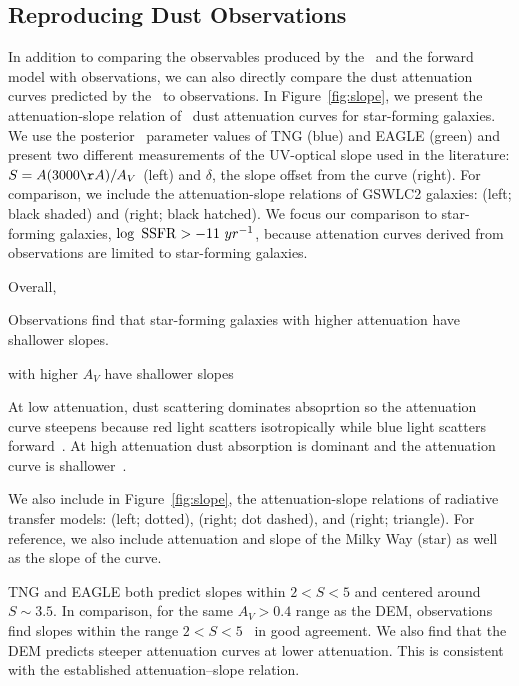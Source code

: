 \subsection{Reproducing Dust Observations} 
In addition to comparing the observables produced by the \eda~and the forward
model with observations, we can also directly compare the dust attenuation
curves predicted by the \eda~to observations. In Figure~\ref{fig:slope}, we
present the attenuation-slope relation of \eda~dust attenuation curves for
star-forming galaxies. We use the posterior \eda~parameter values of TNG (blue)
and EAGLE (green) and present two different measurements of the UV-optical slope
used in the literature: $S = A(3000\AA)/A_V$ (left) and $\delta$, the slope
offset from the \cite{calzetti2001} curve (right). For comparison, we include
the attenuation-slope relations of GSWLC2 galaxies: \cite{salim2020} (left;
black shaded) and \cite{salim2018} (right; black hatched). We focus our
comparison to star-forming galaxies, $\log~{\rm SSFR} > -11~{yr}^{-1}$, because
attenation curves derived from observations are limited to star-forming galaxies. 

Overall, 

Observations find that star-forming galaxies with higher attenuation have
shallower slopes. 

with higher $A_V$ have
shallower slopes


At low attenuation, dust scattering dominates absoprtion so the 
attenuation curve steepens because red light scatters isotropically while blue light
scatters forward~\citep{gordon1994, witt2000, draine2003}. %
At high attenuation dust absorption is dominant and the attenuation curve is
shallower~\citep{chevallard2013}.



We also include in Figure~\ref{fig:slope}, the attenuation-slope relations of
radiative transfer models: \cite{inoue2005} (left; dotted), \cite{chevallard2013}
(right; dot dashed), and \cite{trayford2020} (right; triangle).
For reference, we also include attenuation and slope of the Milky Way (star)
as well as the slope of the \cite{calzetti2001} curve. 








TNG and EAGLE both predict slopes within $2 < S < 5$ and centered around $S\sim
3.5$. In comparison, for the same $A_V > 0.4$ range as the DEM, observations 
find slopes within the range $2 < S < 5$~\citep{calzetti2000, burgarella2005, johnson2007,
conroy2010b, wild2011, battisti2016, battisti2017, leja2017, salim2018} in good
agreement. We also find that the DEM predicts steeper attenuation curves at 
lower attenuation. This is consistent with the established attenuation--slope
relation. 


